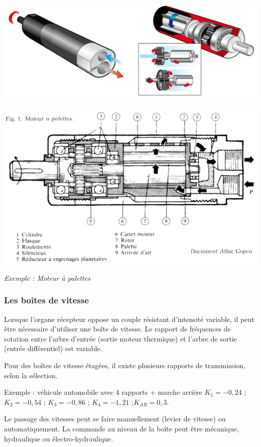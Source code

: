 \documentclass[11pt,oneside]{article}
\begin{document}
\begin{center}
\includegraphics[width=.8\textwidth]{png/fig_86}
\end{center}

\begin{center}
\includegraphics[width=.8\textwidth]{png/fig_87}

\textit{Exemple : Moteur à palettes}
\end{center}


\subsubsection{Les boîtes de vitesse}

Lorsque l’organe récepteur oppose un couple résistant d’intensité variable, il peut être nécessaire d’utiliser une boîte de vitesse. Le rapport de fréquences de rotation entre l’arbre d’entrée (sortie moteur thermique) et l’arbre de sortie (entrée différentiel) est variable.

Pour des boîtes de vitesse étagées, il existe plusieurs rapports de transmission, selon la sélection.

Exemple : véhicule automobile avec 4 rapports + marche arrière
$K_1=-0,24$ ; $K_2=-0,54$ ; $K_3=-0,86$ ; $K_4=-1,21$ ;$K_{AR}=0,3$.

Le passage des vitesses peut se faire manuellement (levier de vitesse) ou automatiquement.
La commande au niveau de la boîte peut être mécanique, hydraulique ou électro-hydraulique.
\end{document}
